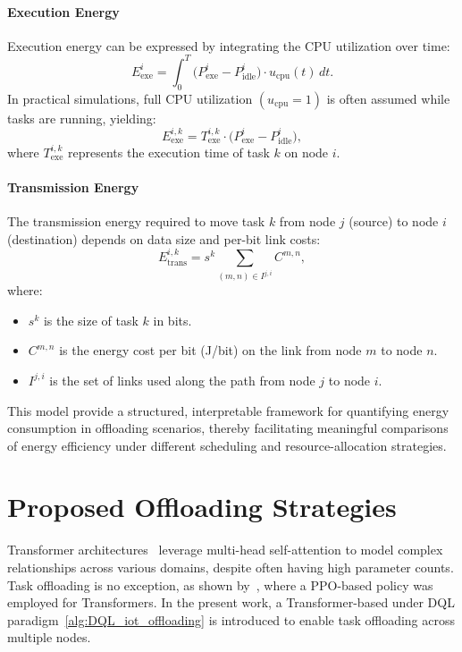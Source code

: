 \documentclass{svproc}
\begin{document}
\paragraph{Execution Energy}
Execution energy can be expressed by integrating the CPU utilization over time:
\begin{equation}
E_{\text{exe}}^{i} = \int_{0}^{T} \bigl(P_{\text{exe}}^{i} - P_{\text{idle}}^{i}\bigr) \cdot u_{\text{cpu}}(t) \, dt.
\end{equation}
In practical simulations, full CPU utilization \((u_{\text{cpu}} = 1)\) is often assumed while tasks are running, yielding:
\begin{equation}
E_{\text{exe}}^{i,k} = T_{\text{exe}}^{i,k} \cdot \bigl(P_{\text{exe}}^{i} - P_{\text{idle}}^{i}\bigr),
\end{equation}
where \(T_{\text{exe}}^{i,k}\) represents the execution time of task \(k\) on node \(i\).

\paragraph{Transmission Energy}
The transmission energy required to move task \(k\) from node \(j\) (source) to node \(i\) (destination) depends on data size and per-bit link costs:
\begin{equation}
E_{\text{trans}}^{i,k} = s^{k} \sum_{(m,n) \in I^{j,i}} C^{m,n},
\end{equation}
where:
\begin{itemize}
    \item \(s^{k}\) is the size of task \(k\) in bits.
    \item \(C^{m,n}\) is the energy cost per bit (J/bit) on the link from node \(m\) to node \(n\).
    \item \(I^{j,i}\) is the set of links used along the path from node \(j\) to node \(i\).
\end{itemize}

This model provide a structured, interpretable framework for quantifying energy consumption in offloading scenarios, thereby facilitating meaningful comparisons of energy efficiency under different scheduling and resource-allocation strategies.


\section{Proposed Offloading Strategies}\label{sec:offloading_strategy}

Transformer architectures~\cite{vaswani2023attentionneed} leverage multi-head self-attention to model complex relationships across various domains, despite often having high parameter counts. Task offloading is no exception, as shown by~\cite{gholipour_tpto_2023}, where a PPO-based policy was employed for Transformers. In the present work, a Transformer-based under DQL paradigm~\ref{alg:DQL_iot_offloading} is introduced to enable task offloading across multiple nodes.
\end{document}
